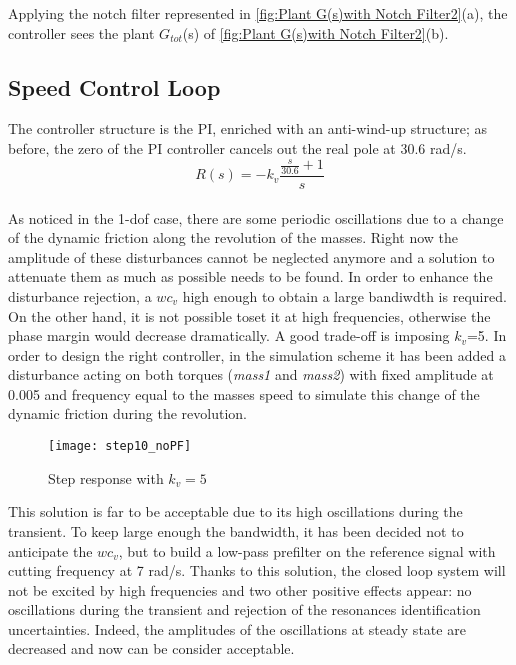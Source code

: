 Applying the notch filter represented in \cref{fig:Plant G(s)with Notch Filter2}(a), the controller sees the plant $G_{tot}$(s) of \cref{fig:Plant G(s)with Notch Filter2}(b).

\newpage 
\subsection{Speed Control Loop}
The controller structure is the PI, enriched with an anti-wind-up structure; as before, the zero of the PI controller cancels out the real pole at 30.6 rad/s.
\\
\[
R(s)=-k_v
\frac{\frac{s}{30.6}+1}{s}
\]
\\

As noticed in the 1-dof case, there are some periodic oscillations due to a change of the dynamic friction along the revolution of the masses. Right now the amplitude of these disturbances cannot be neglected anymore and a solution to attenuate them as much as possible needs to be found. In order to enhance the disturbance rejection, a $wc_v$ high enough to obtain a large bandiwdth is required. On the other hand, it is not possible toset it at high frequencies, otherwise the phase margin would decrease dramatically. A good trade-off is imposing $k_v$=5.
 In order to design the right controller, in the simulation scheme it has been added a disturbance acting on both torques (\textit{mass1} and \textit{mass2}) with fixed amplitude at 0.005 and frequency equal to the masses speed to simulate this change of the dynamic friction during the revolution.
\begin{figure*}[h]
	\centering
	\texttt{[image: step10\_noPF]}
	\caption{Step response with $k_v=5 $}
	\label{fig:step10_noPF}
\end{figure*}
\newline
This solution is far to be acceptable due to its high oscillations during the transient. To keep large enough the bandwidth, it has been decided not to anticipate the $wc_v$, but to build a low-pass prefilter on the reference signal with cutting frequency at 7 rad/s. Thanks to this solution, the closed loop system will not be excited by high frequencies and two other positive effects appear: no oscillations during the transient and rejection of the resonances identification uncertainties. Indeed, the amplitudes of the oscillations at steady state are decreased and now can be consider acceptable. 

